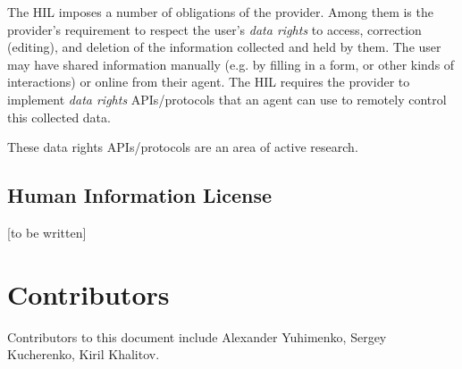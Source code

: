 \documentclass[11pt, oneside]{article}   	%
\begin{document}
The HIL imposes a number of obligations of the provider. Among them is the provider's requirement to respect the user's \emph{data rights} to access, correction (editing), and deletion of the information collected and held by them. The user may have shared information manually (e.g. by filling in a form, or other kinds of interactions) or online from their agent. The HIL requires the provider to implement \emph{data rights} APIs/protocols that an agent can use to remotely control this collected data.

These data rights APIs/protocols are an area of active research.  
    
\subsection{Human Information License}
[to be written]

\section{Contributors}
Contributors to this document include Alexander Yuhimenko, Sergey Kucherenko, Kiril Khalitov.   



\end{document}
